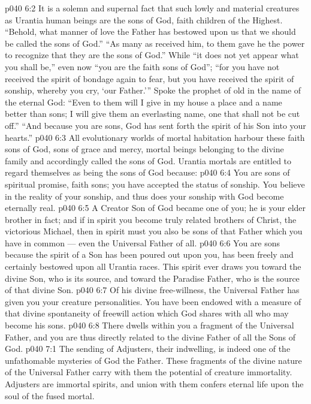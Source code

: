 \vs p040 6:2 It is a solemn and supernal fact that such lowly and material creatures as Urantia human beings are the sons of God, faith children of the Highest. “Behold, what manner of love the Father has bestowed upon us that we should be called the sons of God.” “As many as received him, to them gave he the power to recognize that they are the sons of God.” While “it does not yet appear what you shall be,” even now “you are the faith sons of God”; “for you have not received the spirit of bondage again to fear, but you have received the spirit of sonship, whereby you cry, ‘our Father.’” Spoke the prophet of old in the name of the eternal God: “Even to them will I give in my house a place and a name better than sons; I will give them an everlasting name, one that shall not be cut off.” “And because you are sons, God has sent forth the spirit of his Son into your hearts.”
\vs p040 6:3 All evolutionary worlds of mortal habitation harbour these faith sons of God, sons of grace and mercy, mortal beings belonging to the divine family and accordingly called the sons of God. Urantia mortals are entitled to regard themselves as being the sons of God because:
\vs p040 6:4 \bibnobreakspace You are sons of spiritual promise, faith sons; you have accepted the status of sonship. You believe in the reality of your sonship, and thus does your sonship with God become eternally real.
\vs p040 6:5 \bibnobreakspace A Creator Son of God became one of you; he is your elder brother in fact; and if in spirit you become truly related brothers of Christ, the victorious Michael, then in spirit must you also be sons of that Father which you have in common --- even the Universal Father of all.
\vs p040 6:6 \bibnobreakspace You are sons because the spirit of a Son has been poured out upon you, has been freely and certainly bestowed upon all Urantia races. This spirit ever draws you toward the divine Son, who is its source, and toward the Paradise Father, who is the source of that divine Son.
\vs p040 6:7 \bibnobreakspace Of his divine free\hyp{}willness, the Universal Father has given you your creature personalities. You have been endowed with a measure of that divine spontaneity of freewill action which God shares with all who may become his sons.
\vs p040 6:8 \bibnobreakspace There dwells within you a fragment of the Universal Father, and you are thus directly related to the divine Father of all the Sons of God.
\vs p040 7:1 The sending of Adjusters, their indwelling, is indeed one of the unfathomable mysteries of God the Father. These fragments of the divine nature of the Universal Father carry with them the potential of creature immortality. Adjusters are immortal spirits, and union with them confers eternal life upon the soul of the fused mortal.

